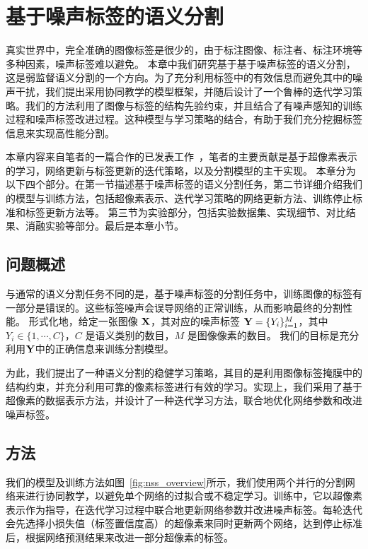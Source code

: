 \chapter{基于噪声标签的语义分割}

真实世界中，完全准确的图像标签是很少的，由于标注图像、标注者、标注环境等多种因素，噪声标签难以避免。
本章中我们研究基于基于噪声标签的语义分割，这是弱监督语义分割的一个方向。为了充分利用标签中的有效信息而避免其中的噪声干扰，我们提出采用协同教学的模型框架，并随后设计了一个鲁棒的迭代学习策略。我们的方法利用了图像与标签的结构先验约束，并且结合了有噪声感知的训练过程和噪声标签改进过程。这种模型与学习策略的结合，有助于我们充分挖掘标签信息来实现高性能分割。

本章内容来自笔者的一篇合作的已发表工作~\cite{li2021superpixel}，笔者的主要贡献是基于超像素表示的学习，网络更新与标签更新的迭代策略，以及分割模型的主干实现。
本章分为以下四个部分。在第一节描述基于噪声标签的语义分割任务，第二节详细介绍我们的模型与训练方法，包括超像素表示、迭代学习策略的网络更新方法、训练停止标准和标签更新方法等。
第三节为实验部分，包括实验数据集、实现细节、对比结果、消融实验等部分。最后是本章小节。

\section{问题概述}
与通常的语义分割任务不同的是，基于噪声标签的分割任务中，训练图像的标签有一部分是错误的。这些标签噪声会误导网络的正常训练，从而影响最终的分割性能。
形式化地，给定一张图像 $\mathbf{X}$，其对应的噪声标签 $\mathbf{Y}=\{Y_i\}_{i=1}^M$，其中 $Y_i\in\{1,\cdots, C\}$，$C$ 是语义类别的数目，$M$ 是图像像素的数目。
我们的目标是充分利用$\mathbf{Y}$中的正确信息来训练分割模型。

为此，我们提出了一种语义分割的稳健学习策略，其目的是利用图像标签掩膜中的结构约束，并充分利用可靠的像素标签进行有效的学习。实现上，我们采用了基于超像素的数据表示方法，并设计了一种迭代学习方法，联合地优化网络参数和改进噪声标签。

\section{方法}
我们的模型及训练方法如图~\ref{fig:nss_overview}所示，我们使用两个并行的分割网络来进行协同教学，以避免单个网络的过拟合或不稳定学习。训练中，它以超像素表示作为指导，在迭代学习过程中联合地更新网络参数并改进噪声标签。每轮迭代会先选择小损失值（标签置信度高）的超像素来同时更新两个网络，达到停止标准后，根据网络预测结果来改进一部分超像素的标签。

